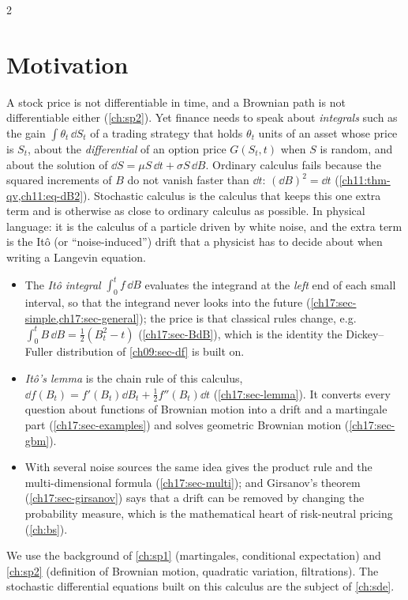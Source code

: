 \begin{paracol}{2}
\section*{Motivation}
A stock price is not differentiable in time, and a Brownian path is not differentiable either
(\cref{ch:sp2}). Yet finance needs to speak about \emph{integrals} such as the gain $\int\theta_t\,\dd S_t$ of a trading
strategy that holds $\theta_t$ units of an asset whose price is $S_t$, about the \emph{differential} of an option price
$G(S_t,t)$ when $S$ is random, and about the solution of $\dd S=\mu S\,\dd t+\sigma S\,\dd B$. Ordinary calculus fails because
the squared increments of $B$ do not vanish faster than $\dd t$: $(\dd B)^2=\dd t$
(\cref{ch11:thm-qv,ch11:eq-dB2}). Stochastic calculus is the calculus that keeps this one extra term and is otherwise
as close to ordinary calculus as possible. In physical language: it is the calculus of a particle
driven by white noise, and the extra term is the It\^o (or ``noise-induced'') drift that a physicist has to decide
about when writing a Langevin equation.
\begin{itemize}
  \item The \emph{It\^o integral} $\int_0^tf\,\dd B$ evaluates the integrand at the \emph{left} end of each small
        interval, so that the integrand never looks into the future (\cref{ch17:sec-simple,ch17:sec-general}); the price is
        that classical rules change, e.g.\ $\int_0^tB\,\dd B=\tfrac12(B_t^2-t)$ (\cref{ch17:sec-BdB}), which is the identity the Dickey--Fuller
        distribution of \cref{ch09:sec-df} is built on.
  \item \emph{It\^o's lemma} is the chain rule of this calculus, $\dd f(B_t)=f'(B_t)\dd B_t+\tfrac12f''(B_t)\dd t$
        (\cref{ch17:sec-lemma}). It converts every question about functions of Brownian motion into a
        drift and a martingale part (\cref{ch17:sec-examples}) and solves geometric Brownian motion
        (\cref{ch17:sec-gbm}).
  \item With several noise sources the same idea gives the product rule and the multi-dimensional formula
        (\cref{ch17:sec-multi}); and Girsanov's theorem (\cref{ch17:sec-girsanov}) says that a drift can be removed
        by changing the probability measure, which is the mathematical heart of risk-neutral pricing
        (\cref{ch:bs}).
\end{itemize}
We use the background of \cref{ch:sp1} (martingales, conditional expectation) and \cref{ch:sp2} (definition of Brownian
motion, quadratic variation, filtrations). The stochastic differential equations built on this calculus are the subject of
\cref{ch:sde}.


\end{paracol}
